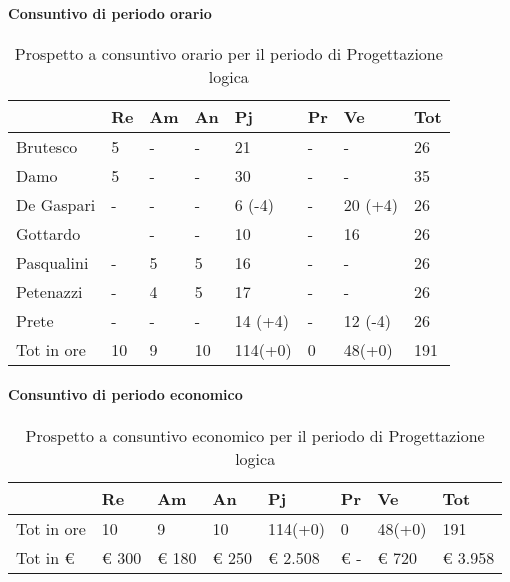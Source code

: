 	\paragraph{Consuntivo di periodo orario}
								\begin{table}[h] \begin{center} \begin{tabular}{llllllll}																						
								\toprule																						
									&	Re		&	Am		&	An		&	Pj		&	Pr		&	Ve		&	Tot	 \\ 	
								\midrule																		
								Brutesco	&	5		&	-		&	-		&	21		&	-		&	-		&	26	\\
								Damo		&	5		&	-		&	-		&	30		&	-		&	-		&	35	\\
								De Gaspari	&	-		&	-		&	-		&	6	(-4)	&	-		&	20	(+4)	&	26	\\
								Gottardo	&			&	-		&	-		&	10		&	-		&	16		&	26	\\
								Pasqualini	&	-		&	5		&	5		&	16		&	-		&	-		&	26	\\
								Petenazzi	&	-		&	4		&	5		&	17		&	-		&	-		&	26	\\
								Prete	&	-		&	-		&	-		&	14	(+4)	&	-		&	12	(-4)	&	26	\\
								\midrule																					
								Tot in ore	&	10		&	9		&	10		&	114(+0)		&	0		&	48(+0)		&	191	\\
								
								\bottomrule
								\end{tabular} \end{center} \caption{Prospetto a consuntivo orario per il periodo di																						
									Progettazione logica																						
									}\label{tab:orePl} \end{table}	
	\paragraph{Consuntivo di periodo economico}
								\begin{table}[H] \begin{center} \begin{tabular}{llllllll}																						
							\toprule	
								&	Re		&	Am		&	An		&	Pj		&	Pr		&	Ve		&	Tot	 \\ 	
							\midrule																		
							Tot in ore	&	10		&	9		&	10		&	114(+0)		&	0		&	48(+0)		&	191	\\
							Tot in €	&	 € 300 		 & 	 € 180 		 & 	 € 250 		 & 	 € 2.508 		 & 	 € -   		 & 	 € 720 		 & 	 € 3.958 	\\
							\bottomrule																						
							\end{tabular} \end{center} \caption{Prospetto a consuntivo economico per il periodo di																						
							Progettazione logica																						
							}\label{tab:sPl} \end{table}
	
